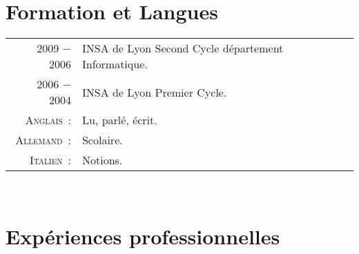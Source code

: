 \documentclass[a4paper,10pt]{article}
\begin{document}
\section{Formation et Langues}
\begin{tabular}{rl}
  2009 − 2006  & INSA de Lyon Second Cycle département Informatique. \\
  2006 − 2004  & INSA de Lyon Premier Cycle. \\
  \textsc{Anglais :}    & Lu, parlé, écrit. \\
  \textsc{Allemand :}   & Scolaire. \\
  \textsc{Italien :}    & Notions. \\
\end{tabular} \\

\section{Expériences professionnelles}
\end{document}

